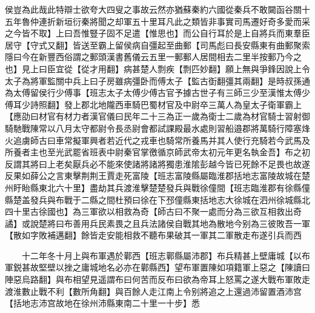 侯豈為此哉此特辯士欲夸大四叟之事故云然亦猶蘇秦約六國從秦兵不敢闚函谷關十五年魯仲連折新垣衍秦將聞之却軍五十里耳凡此之類皆非事實司馬遷好奇多愛而采之今皆不取】上曰吾惟豎子固不足遣【惟思也】而公自行耳於是上自將兵而東羣臣居守【守式又翻】皆送至霸上留侯病自彊起至曲郵【司馬彪曰長安縣東有曲郵聚索隱曰今在新豐西俗謂之郵頭漢書舊儀云五里一郵郵人居間相去二里半按郵乃今之也】見上曰臣宜從【從才用翻】病甚楚人剽疾【剽匹妙翻】願上無與爭鋒因說上令太子為將軍監關中兵上曰子房雖病彊卧而傅太子【監古衘翻彊其兩翻】是時叔孫通為太傅留侯行少傅事【班志太子太傅少傅古官予據古世子有三師三少至漢惟太傅少傅耳少詩照翻】發上郡北地隴西車騎巴蜀材官及中尉卒三萬人為皇太子衛軍霸上【應劭曰材官有材力者漢官儀曰民年二十三為正一歲為衛士二歲為材官騎士習射御騎馳戰陳常以八月太守都尉令長丞尉會都試課殿最水處則習船邉郡將萬騎行障塞烽火追虜師古曰車常擬軍興者若近代之戎車也騎常所養馬并其人使行充騎若今武馬及所養者主也至光武罷省班表中尉秦官掌徼循京師武帝太初元年更名執金吾】布之初反謂其將曰上老矣厭兵必不能來使諸將諸將獨患淮隂彭越今皆已死餘不足畏也故遂反果如薛公之言東擊荆荆王賈走死富陵【班志富陵縣屬臨淮郡括地志富陵故城在楚州盱眙縣東北六十里】盡劫其兵渡淮擊楚楚發兵與戰徐僮間【班志臨淮郡有徐縣僮縣楚盖發兵與布戰于二縣之間杜預曰徐在下邳僮縣東括地志大徐城在泗州徐城縣北四十里古徐國也】為三軍欲以相救為奇【師古曰不聚一處而分為三欲互相救出奇譎】或說楚將曰布善用兵民素畏之且兵法諸侯自戰其地為散地今别為三彼敗吾一軍【散如字敗補邁翻】餘皆走安能相救不聽布果破其一軍其二軍散走布遂引兵而西

　　十二年冬十月上與布軍遇於鄿西【班志鄿縣屬沛郡】布兵精甚上壁庸城【以布軍鋭甚故堅壁以挫之庸城地名必亦在鄿縣西】望布軍置陳如項籍軍上惡之【陳讀曰陣惡烏路翻】與布相望見遥謂布曰何苦而反布曰欲為帝耳上怒罵之遂大戰布軍敗走渡淮數止戰不利【數所角翻】與百餘人走江南上令别將追之上還過沛留置酒沛宫【括地志沛宫故地在徐州沛縣東南二十里一十步】悉

